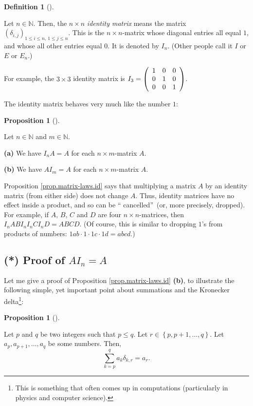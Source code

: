 \documentclass[numbers=enddot,12pt,final,onecolumn,notitlepage]{scrartcl}%
\theoremstyle{definition}
\newtheorem{prop}[theo]{Proposition}
\newenvironment{proposition}[1][]
{\begin{prop}[#1]\begin{leftbar}}
{\end{leftbar}\end{prop}}
\newtheorem{defi}[theo]{Definition}
\newenvironment{definition}[1][]
{\begin{defi}[#1]\begin{leftbar}}
{\end{leftbar}\end{defi}}
\let\sumnonlimits\sum
\renewcommand{\sum}{\sumnonlimits\limits}
\begin{document}
\begin{definition}
Let $n\in\mathbb{N}$. Then, the $n\times n$ \textit{identity matrix} means the
matrix $\left(  \delta_{i,j}\right)  _{1\leq i\leq n,\ 1\leq j\leq n}$. This
is the $n\times n$-matrix whose diagonal entries all equal $1$, and whose all
other entries equal $0$. It is denoted by $I_{n}$. (Other people call it $I$
or $E$ or $E_{n}$.)
\end{definition}

For example, the $3\times3$ identity matrix is $I_{3}=\left(
\begin{array}
[c]{ccc}%
1 & 0 & 0\\
0 & 1 & 0\\
0 & 0 & 1
\end{array}
\right)  $.

The identity matrix behaves very much like the number $1$:

\begin{proposition}
\label{prop.matrix-laws.id}Let $n\in\mathbb{N}$ and $m\in\mathbb{N}$.

\textbf{(a)} We have $I_{n}A=A$ for each $n\times m$-matrix $A$.

\textbf{(b)} We have $AI_{m}=A$ for each $n\times m$-matrix $A$.
\end{proposition}

Proposition \ref{prop.matrix-laws.id} says that multiplying a matrix $A$ by an
identity matrix (from either side) does not change $A$. Thus, identity
matrices have no effect inside a product, and so can be \textquotedblleft
cancelled\textquotedblright\ (or, more precisely, dropped). For example, if
$A$, $B$, $C$ and $D$ are four $n\times n$-matrices, then $I_{n}ABI_{n}%
I_{n}CI_{n}D=ABCD$. (Of course, this is similar to dropping $1$'s from
products of numbers: $1ab\cdot1\cdot1c\cdot1d=abcd$.)

\subsection{(*) Proof of $AI_{n}=A$}

Let me give a proof of Proposition \ref{prop.matrix-laws.id} \textbf{(b)}, to
illustrate the following simple, yet important point about summations and the
Kronecker delta\footnote{This is something that often comes up in computations
(particularly in physics and computer science).}:

\begin{proposition}
\label{prop.sum.delta}Let $p$ and $q$ be two integers such that $p\leq q$. Let
$r\in\left\{  p,p+1,\ldots,q\right\}  $. Let $a_{p},a_{p+1},\ldots,a_{q}$ be
some numbers. Then,%
\[
\sum_{k=p}^{q}a_{k}\delta_{k,r}=a_{r}.
\]

\end{proposition}
\end{document}
